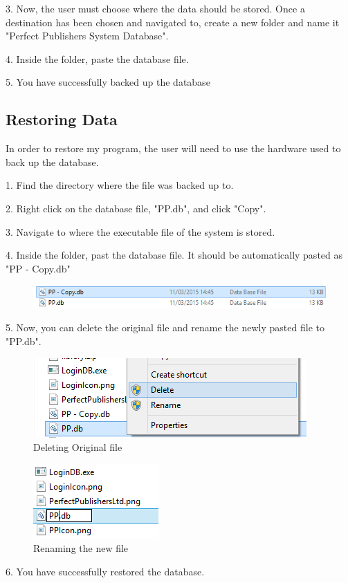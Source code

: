 3. Now, the user must choose where the data should be stored. Once a destination has been chosen and navigated to, create a new folder and name it "Perfect Publishers System Database".

4. Inside the folder, paste the database file.

5. You have successfully backed up the database

\subsection{Restoring Data}

In order to restore my program, the user will need to use the hardware used to back up the database.

1. Find the directory where the file was backed up to.

2. Right click on the database file, "PP.db", and click "Copy".

3. Navigate to where the executable file of the system is stored.

4. Inside the folder, past the database file. It should be automatically pasted as "PP - Copy.db"

\begin{figure}[H]
    \includegraphics[width=\textwidth]{./Manual/CopiedFile.png}
\end{figure}

5. Now, you can delete the original file and rename the newly pasted file to "PP.db".

\begin{figure}[H]
    \includegraphics[width=\textwidth]{./Manual/DeleteOriginal.png}
    \caption{Deleting Original file}
\end{figure}

\begin{figure}[H]
    \includegraphics[width=\textwidth]{./Manual/Rename.png}
    \caption{Renaming the new file}
\end{figure}

6. You have successfully restored the database.